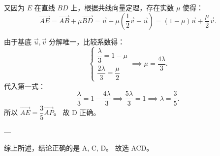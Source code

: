 {  又因为 \(E\) 在直线 \(BD\) 上，根据共线向量定理，存在实数 \(\mu\) 使得：
  \[
    \overrightarrow{AE} = \overrightarrow{AB} + \mu \overrightarrow{BD} = \vec{u} + \mu\left(\frac{1}{2}\vec{v} - \vec{u}\right) = (1 - \mu)\vec{u} + \frac{\mu}{2}\vec{v}.
  \]
  
  由于基底 \(\vec{u}, \vec{v}\) 分解唯一，比较系数得：
  \[
    \begin{cases}
      \dfrac{\lambda}{3} = 1 - \mu \\[6pt]
      \dfrac{2\lambda}{3} = \dfrac{\mu}{2}
    \end{cases}
    \implies \mu = \frac{4\lambda}{3}.
  \]
  代入第一式：
  \[
    \frac{\lambda}{3} = 1 - \frac{4\lambda}{3} \implies \frac{5\lambda}{3} = 1 \implies \lambda = \frac{3}{5}.
  \]
  所以 \(\overrightarrow{AE} = \dfrac{3}{5}\overrightarrow{AP}\)。
  故 D 正确。
  
  ---
  
  综上所述，结论正确的是 A, C, D。
  故选 ACD。%
}

\newcommand{\qTJWVectorTriangleIntersectionStem}{\qVectorTriangleIntersectionStem}
\newcommand{\qTJWVectorTriangleIntersectionOptions}{\qVectorTriangleIntersectionOptions}
\newcommand{\qTJWVectorTriangleIntersectionFigure}{\qVectorTriangleIntersectionFigure}
\newcommand{\qTJWVectorTriangleIntersectionAnswer}{\qVectorTriangleIntersectionAnswer}
\newcommand{\qTJWVectorTriangleIntersectionSolution}{\qVectorTriangleIntersectionSolution}
